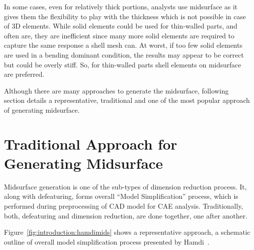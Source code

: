 In some cases, even for relatively thick portions, analysts use midsurface as it gives them the flexibility to play with the thickness which is not possible in case of 3D elements. While solid elements could be used for thin-walled parts, and often are, they are inefficient since many more solid elements are required to capture the same response a shell mesh can. At worst, if too few solid elements are used in a bending dominant condition, the results may appear to be correct but could be overly stiff. So, for thin-walled parts shell elements on midsurface are preferred\cite{Cosmos2006}.
	
Although there are many approaches to generate the midsurface, following section details a representative, traditional and one of the most popular approach of generating midsurface.
	
\section{Traditional Approach for Generating Midsurface}


Midsurface generation is one of the sub-types of dimension reduction process. It, along with defeaturing, forms overall ``Model Simplification'' process, which is performed during preprocessing of CAD model for CAE analysis. Traditionally, both, defeaturing and dimension reduction, are done together, one after another.



Figure~\ref{fig:introduction:hamdimids} shows a representative approach, a schematic outline of overall model simplification process presented by Hamdi~\cite{Hamdi2005, Hamdi2007, Hamdi2009, Hamdi2010, Hamdi2012}.

